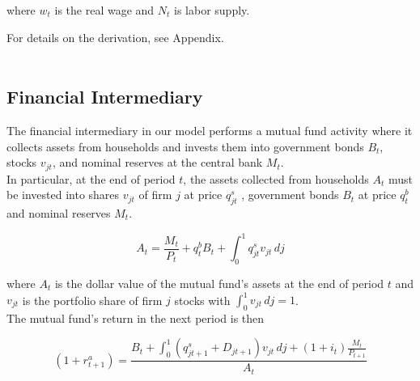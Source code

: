\documentclass[titlepage]{\econtex}\providecommand{\texname}{BufferStockTheory}
\begin{document}
where $w_{t}$ is the real wage and $N_{t}$  is labor supply.

For details on the derivation, see Appendix.\\ \\


\begin{comment}
Combining the transition equations, the recursive nature of
the problem allows us to rewrite it more compactly in Bellman equation form,
\begin{eqnarray*}
\VFunc_{t}(\mLevBF_{t},\pLevBF_{t}) & = & \max_{\cLevBF_{t}}~\left\{\util(\cLevBF_{t})+\DiscFac \Ex_{t}\left[ \VFunc_{t+1}((\mLevBF_{t}-\cLevBF_{t})\Rfree+ \pLevBF_{t+1}\tShkAll_{t+1},\pLevBF_{t} \PGro  \pShk_{t+1})\right]\right\}
.
\end{eqnarray*}
\end{comment} 

\hypertarget{Financial Intermediary}{}
\subsection{Financial Intermediary}

\label{subsec:Financial Intermediary}

The financial intermediary in our model performs a mutual fund activity where it  collects assets from households and invests them into government bonds $B_{t}$, stocks $v_{jt}$, and nominal reserves at the central bank $M_{t}$.\\ 

In particular, at the end of period $t$, the assets collected from households $A_{t}$ must be invested into shares $\mathit{v}_{jt}$ of firm $j$ at price  $q^{s}_{jt}$ , government bonds $B_{t}$ at price $q^{b}_{t}$ and nominal reserves $M_{t}$. 

\begin{equation} A_{t} = \frac{M_{t}}{P_{t}} +q^{b}_{t} B_{t} + \int_{0}^{1} q^{s}_{jt}\mathit{v}_{jt}\,dj \end{equation}

where $A_{t} $ is the dollar value of the mutual fund's assets at the end of period $t$ and $ \mathit{v}_{jt}$ is the portfolio share of firm $j$ stocks with $\int_{0}^{1} \mathit{v}_{jt}\,dj =1$.  \\

The mutual fund's return in the next period is then 

$$(1+r^{a}_{t+1})  = \frac{  B_{t} + \int_{0}^{1} (q^{s}_{jt+1}+ D_{jt+1})\mathit{v}_{jt} \, dj +(1+i_{t}) \frac{M_{t}}{P_{t+1}}}{A_{t}}$$\\ 
\end{document}
